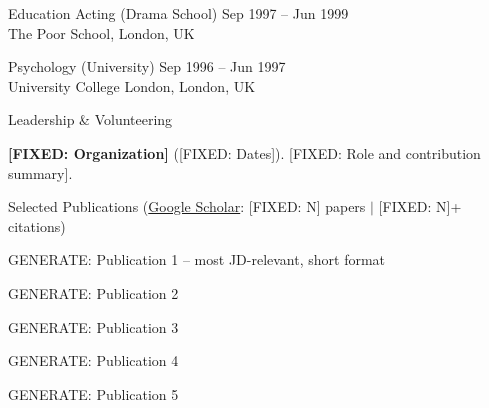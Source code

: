 \documentclass{resume}
\begin{document}

\begin{rSection}{Education}
{Acting (Drama School)} \hfill {\textcolor{black!60}{Sep 1997 -- Jun 1999}}\\
{The Poor School}, London, UK

{Psychology (University)} \hfill {\textcolor{black!60}{Sep 1996 -- Jun 1997}}\\
{University College London}, London, UK
\end{rSection}
\vspace{-0.15cm}


\begin{rSection2}{Leadership \& Volunteering}
\item \textbf{[FIXED: Organization]} ([FIXED: Dates]). [FIXED: Role and contribution summary].
\end{rSection2}
\vspace{-0.15cm}

\begin{rSection2}{Selected Publications (\href{[CONFIG: Google Scholar URL]}{Google Scholar}: [FIXED: N] papers $\vert$ [FIXED: N]+ citations)}

\item [GENERATE: Publication 1 -- most JD-relevant, short format]

\item [GENERATE: Publication 2]

\item [GENERATE: Publication 3]

\item [GENERATE: Publication 4]

\item [GENERATE: Publication 5]

\end{rSection2}
\vspace{-0.15cm}
\end{document}
